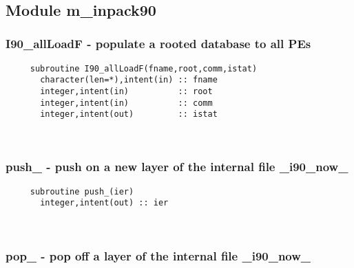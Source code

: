 
\mbox{}\hrulefill\

\subsection{Module m\_inpack90}
 
  \subsubsection{I90\_allLoadF - populate a rooted database to all PEs}

\begin{verbatim} 
     subroutine I90_allLoadF(fname,root,comm,istat)
       character(len=*),intent(in) :: fname
       integer,intent(in)          :: root
       integer,intent(in)          :: comm
       integer,intent(out)         :: istat
 \end{verbatim}%
 
 
\mbox{}\hrulefill\ 
 
  \subsubsection{push\_ - push on a new layer of the internal file \_i90\_now\_}

\begin{verbatim} 
     subroutine push_(ier)
       integer,intent(out) :: ier
 \end{verbatim}%
 
 
\mbox{}\hrulefill\ 
 
  \subsubsection{pop\_ - pop off a layer of the internal file \_i90\_now\_}

